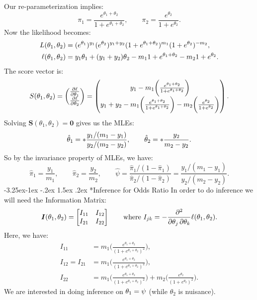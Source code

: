 \documentclass[final]{article}\usepackage[]{graphicx}\usepackage[svgnames]{xcolor}
\makeatletter
\renewcommand\subsection{\@startsection{subsection}{2}{\z@}%
                                     {-3.25ex\@plus -1ex \@minus -.2ex}%
                                     {1.5ex \@plus .2ex}%
                                     {\normalfont\large\bfseries\scshape\color{Blue}}}
\let\log\relax%
\providecommand{\Vector}[1]{\bm{#1}}%
\providecommand{\Matrix}[1]{\bm{#1}}
\makeatother
\begin{document}
Our re-parameterization implies:
\[ \pi_1=\frac{e^{\theta_1+\theta_2}}{1+e^{\theta_1+\theta_2}},\qquad \pi_2=\frac{e^{\theta_2}}{1+e^{\theta_2}}. \]
Now the likelihood becomes:
\begin{align*}
    L(\theta_1,\theta_2)    & =(e^{\theta_1})^{y_1}(e^{\theta_2})^{y_1+y_2}(1+e^{\theta_1+\theta_2})^{m_1}(1+e^{\theta_2})^{-m_2}, \\
    \ell(\theta_1,\theta_2) & =y_1\theta_1+(y_1+y_2)\theta_2-m_1\log{1+e^{\theta_1+\theta_2}}-m_2\log{1+e^{\theta_2}}.
\end{align*}
The score vector is:
\[ S(\theta_1,\theta_2)=\begin{pmatrix}
        \pdv{\ell}{\theta_1} \\
        \pdv{\ell}{\theta_2}
    \end{pmatrix}=\begin{pmatrix}
        y_1-m_1\biggl(\frac{e^{\theta_1+\theta_2}}{1+e^{\theta_1+\theta_2}} \biggr) \\
        y_1+y_2-m_1\biggl(\frac{e^{\theta_1+\theta_2}}{1+e^{\theta_1+\theta_2}} \biggr)-m_2\biggl(\frac{e^{\theta_2}}{1+e^{\theta_2}} \biggr)
    \end{pmatrix}. \]
Solving $ \Vector{S}(\theta_1,\theta_2)=\Vector{0} $ gives us the MLEs:
\[ \hat{\theta}_1=\log*{\frac{y_1/(m_1-y_1)}{y_2/(m_2-y_2)}},\qquad \hat{\theta}_2=\log*{\frac{y_2}{m_2-y_2}}. \]
So by the invariance property of MLEs, we have:
\[ \hat{\pi}_1=\frac{y_1}{m_1},\qquad \hat{\pi}_2=\frac{y_2}{m_2},\qquad\hat{\psi}=\frac{\hat{\pi}_1/(1-\hat{\pi}_1)}{\hat{\pi}_2/(1-\hat{\pi}_2)}=\frac{y_1/(m_1-y_1)}{y_2/(m_2-y_2)}.  \]
\subsection*{Inference for Odds Ratio}
In order to do inference we will need the Information Matrix:
\[ \Matrix{I}(\theta_1,\theta_2)=\begin{bmatrix}
        I_{11} & I_{12} \\
        I_{21} & I_{22}
    \end{bmatrix}\qquad\text{where }I_{jk}=-\pdv*{\ell(\theta_1,\theta_2)}{\theta_j,\theta_k}. \]
Here, we have:
\begin{align*}
    I_{11}          & =m_1\biggl(\frac{e^{\theta_1+\theta_2}}{(1+e^{\theta_1+\theta_2})^2} \biggr),                                                           \\
    I_{12}  =I_{21} & =m_1\biggl(\frac{e^{\theta_1+\theta_2}}{(1+e^{\theta_1+\theta_2})^2} \biggr),                                                           \\
    I_{22}          & =m_1\biggl(\frac{e^{\theta_1+\theta_2}}{(1+e^{\theta_1+\theta_2})^2} \biggr)+m_2\biggl(\frac{e^{\theta_2}}{(1+e^{\theta_2})^2} \biggr).
\end{align*}
We are interested in doing inference on $ \theta_1=\log{\psi} $ (while $ \theta_2 $ is nuisance).
\end{document}
